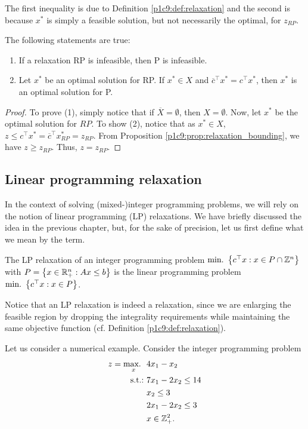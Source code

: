 The first inequality is due to Definition \ref{p1c9:def:relaxation} and the second is because $x^*$ is simply a feasible solution, but not necessarily the optimal, for $z_{RP}$. 

\begin{proposition} \label{p1c9:prop:relaxation_optimality}
  The following statements are true:
  \begin{enumerate}
  	\item If a relaxation RP is infeasible, then P is infeasible. 
  	\item Let $x^*$ be an optimal solution for RP. If $x^* \in X$ and $\overline{c}^\top x^* = c^\top x^*$, then $x^*$ is an optimal solution for P.
  \end{enumerate}
\end{proposition}
%
\begin{proof}
    To prove (1), simply notice that if $\overline{X} = \emptyset$, then $X = \emptyset$. Now, let $x^*$ be the optimal solution for $RP$. To show (2), notice that as $x^* \in X$, $z \leq c^\top x^* = \overline{c}^\top x^*_{RP} = z_{RP}$. From Proposition \ref{p1c9:prop:relaxation_bounding}, we have $z \geq z_{RP}$. Thus, $z = z_{RP}$. 
\end{proof}


\subsection{Linear programming relaxation}

In the context of solving (mixed-)integer programming problems, we will rely on the notion of linear programming (LP) relaxations. We have briefly discussed the idea in the previous chapter, but, for the sake of precision, let us first define what we mean by the term. 

\begin{definition}
  The LP relaxation of an integer programming problem $\mathop{\text{min.~}} \left\{ c^\top x : x \in P \cap \mathbb{Z}^n \right \}$ with $P = \left\{ x \in \mathbb{R}^n_+ : Ax \leq b \right \}$ is the linear programming problem $\mathop{\text{min.~}} \left\{ c^\top x : x \in P \right \}$.
\end{definition} 

Notice that an LP relaxation is indeed a relaxation, since we are enlarging the feasible region by dropping the integrality requirements while maintaining the same objective function (cf. Definition \ref{p1c9:def:relaxation}).

Let us consider a numerical example. Consider the integer programming problem
% 
\begin{align*}
	z = \mathop{\text{max.~}}_x ~& 4x_1 -x_2 \\
	\mathop{\text{s.t.:~}} &  7x_1 -2x_2 \leq 14 \\
	    & x_2 \leq 3 \\
	    & 2x_1 - 2x_2 \leq 3\\
	    & x \in \mathbb{Z}^2_+. 
\end{align*}


